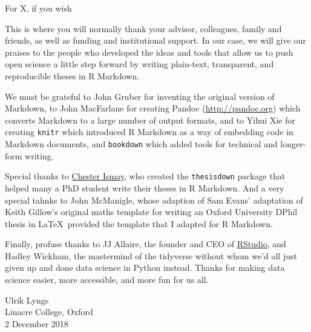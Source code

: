\documentclass{iheid}
\begin{document}
\begin{romanpages}

\begin{dedication}
  For X, if you wish
\end{dedication}

\begin{acknowledgements}
 	This is where you will normally thank your advisor, colleagues, family
  and friends, as well as funding and institutional support. In our
  case, we will give our praises to the people who developed the ideas
  and tools that allow us to push open science a little step forward by
  writing plain-text, transparent, and reproducible theses in R
  Markdown.

  We must be grateful to John Gruber for inventing the original version
  of Markdown, to John MacFarlane for creating Pandoc
  (\url{http://pandoc.org}) which converts Markdown to a large number of
  output formats, and to Yihui Xie for creating \texttt{knitr} which
  introduced R Markdown as a way of embedding code in Markdown
  documents, and \texttt{bookdown} which added tools for technical and
  longer-form writing.

  Special thanks to \href{http://chester.rbind.io}{Chester Ismay}, who
  created the \texttt{thesisdown} package that helped many a PhD student
  write their theses in R Markdown. And a very special tahnks to John
  McManigle, whose adaption of Sam Evans' adaptation of Keith Gillow's
  original maths template for writing an Oxford University DPhil thesis
  in \LaTeX~provided the template that I adapted for R Markdown.

  Finally, profuse thanks to JJ Allaire, the founder and CEO of
  \href{http://rstudio.com}{RStudio}, and Hadley Wickham, the mastermind
  of the tidyverse without whom we'd all just given up and done data
  science in Python instead. Thanks for making data science easier, more
  accessible, and more fun for us all.

  \begin{flushright}
  Ulrik Lyngs \\
  Linacre College, Oxford \\
  2 December 2018
  \end{flushright}
\end{acknowledgements}




\end{romanpages}
\end{document}
